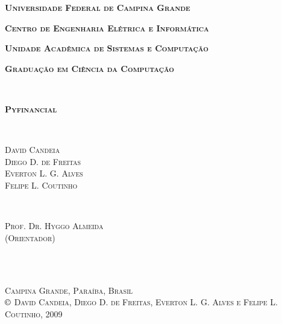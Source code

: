 \pagestyle{empty}

\begin{center}
{\textbf{\Large \textsc{Universidade Federal de Campina Grande}}}
\end{center}

\begin{center}
\textbf{{\Large \textsc{Centro de Engenharia Elétrica e
Informática}}}
\end{center}

\begin{center}
\textbf{{\Large \textsc{Unidade Acadêmica de Sistemas e
Computação}}}
\end{center}

\begin{center}
{\large \textsc{\textbf{Graduação em Ciência da Computação}}}
\end{center}


~\\


\begin{center}
{\Large \textsc{\textbf{Pyfinancial}}}
\end{center}
~\\

\begin{center}
\large{\textsc{David Candeia}\\ \textsc{Diego D. de Freitas}\\ \textsc{Everton L. G. Alves}\\
\textsc{Felipe L. Coutinho}}
\end{center}

% 
~\\

\begin{center}
\textsc{Prof. Dr. Hyggo Almeida}\\
\textsc{(Orientador)}\\
\end{center}

~\\
~\\

\begin{center}
{\small \textsc{Campina Grande, Paraíba, Brasil}}\\
{\small \textsc{$\copyright$ David Candeia, Diego D. de Freitas, Everton L. G. Alves e Felipe L. Coutinho, 2009}}
\end{center}

\cleardoublepage
